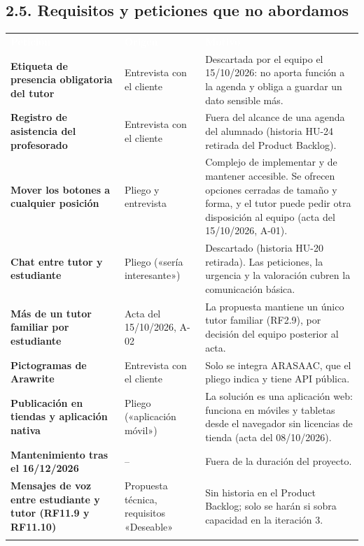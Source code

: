 \documentclass[11pt,a4paper]{article}
\newcommand{\hl}[1]{\textcolor{gblue}{\textbf{#1}}}
\begin{document}
\subsection*{2.5. Requisitos y peticiones que no abordamos}
{\small\par\noindent\begin{tabular}{@{}>{\raggedright\arraybackslash}p{}>{\raggedright\arraybackslash}p{}>{\raggedright\arraybackslash}p{}@{}}
\rowcolor{gblue}\textcolor{white}{\textbf{Petición}} & \textcolor{white}{\textbf{Origen}} & \textcolor{white}{\textbf{Motivo}} \\
\hl{Etiqueta de presencia obligatoria del tutor} & Entrevista con el cliente & Descartada por el equipo el 15/10/2026: no aporta función a la agenda y obliga a guardar un dato sensible más. \\ \arrayrulecolor{gline}\hline
\rowcolor{glight}
\hl{Registro de asistencia del profesorado} & Entrevista con el cliente & Fuera del alcance de una agenda del alumnado (historia HU-24 retirada del Product Backlog). \\ \arrayrulecolor{gline}\hline
\hl{Mover los botones a cualquier posición} & Pliego y entrevista & Complejo de implementar y de mantener accesible. Se ofrecen opciones cerradas de tamaño y forma, y el tutor puede pedir otra disposición al equipo (acta del 15/10/2026, A-01). \\ \arrayrulecolor{gline}\hline
\rowcolor{glight}
\hl{Chat entre tutor y estudiante} & Pliego («sería interesante») & Descartado (historia HU-20 retirada). Las peticiones, la urgencia y la valoración cubren la comunicación básica. \\ \arrayrulecolor{gline}\hline
\hl{Más de un tutor familiar por estudiante} & Acta del 15/10/2026, A-02 & La propuesta mantiene un único tutor familiar (RF2.9), por decisión del equipo posterior al acta. \\ \arrayrulecolor{gline}\hline
\rowcolor{glight}
\hl{Pictogramas de Arawrite} & Entrevista con el cliente & Solo se integra ARASAAC, que el pliego indica y tiene API pública. \\ \arrayrulecolor{gline}\hline
\hl{Publicación en tiendas y aplicación nativa} & Pliego («aplicación móvil») & La solución es una aplicación web: funciona en móviles y tabletas desde el navegador sin licencias de tienda (acta del 08/10/2026). \\ \arrayrulecolor{gline}\hline
\rowcolor{glight}
\hl{Mantenimiento tras el 16/12/2026} & -- & Fuera de la duración del proyecto. \\ \arrayrulecolor{gline}\hline
\rowcolor{glight}
\hl{Mensajes de voz entre estudiante y tutor (RF11.9 y RF11.10)} & Propuesta técnica, requisitos «Deseable» & Sin historia en el Product Backlog; solo se harán si sobra capacidad en la iteración 3. \\ \arrayrulecolor{gline}\hline
\end{tabular}\par}\medskip
\end{document}
